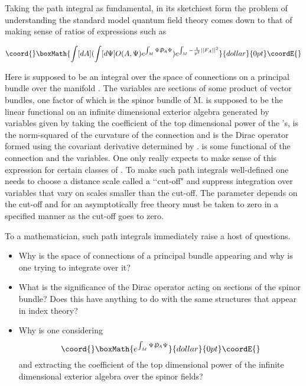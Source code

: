 \documentclass[a4paper,a4paper]{article}
\theoremstyle{conjecture}
\def\Slash#1{#1\!\!\!\!/}
\def\Dirac{\Slash D}
\begin{document}
Taking the path integral as fundamental, in its sketchiest form the problem of understanding
the standard model quantum field theory comes down to that of making sense
of ratios of expressions such as

$$\coord{}\boxMath{\int [dA]  (\int [d\Psi] O(A,\Psi) e^{\int_M
\Psi\Dirac_A\Psi})e^{\int_M -\frac{1}{g^2} ||F_A||^2}}{dollar}{0pt}\coordE{}$$

Here \myHighlight{$\int [dA]$}\coordHE{} is supposed to be an integral over the space of connections on
a principal bundle over the manifold \coordHE{}. The variables  \myHighlight{$\Psi$}\coordHE{} are
sections of some product of vector bundles, one factor of which is the spinor bundle of M. \myHighlight{$\int [d\Psi]$}\coordHE{} is supposed to
be the linear functional on an infinite dimensional exterior algebra generated by variables \myHighlight{$\Psi$}\coordHE{} given
by taking the coefficient of the top dimensional power of the \myHighlight{$\Psi$}\coordHE{}'s, \coordHE{}
is the norm-squared of the curvature of the connection \coordHE{} and \myHighlight{$\Dirac_A$}\coordHE{} is the
Dirac operator formed using the covariant derivative determined by \coordHE{}. 
\coordHE{}
is some functional of the connection and the \myHighlight{$\Psi$}\coordHE{} variables. One only really expects
to make sense of this expression for certain classes of \coordHE{}.  To make such path
integrals well-defined one needs to choose a distance scale called a \lq\lq cut-off"
and suppress integration over
variables that vary on scales smaller than the cut-off.  The parameter \coordHE{} depends on the
cut-off and for an asymptotically free theory must be taken to zero in a specified manner
as the cut-off goes to zero.

To a mathematician, such path integrals immediately raise a host of questions.
\begin{itemize}
\item
Why is the space of connections
of a principal bundle appearing and why is one trying to integrate over it?
\item
What is the
significance of the Dirac operator acting on sections of the spinor bundle? Does this
have anything to do with the same structures that appear in index theory?
\item
Why is one considering
$$\coord{}\boxMath{e^{\int_M\Psi\Dirac_A\Psi}}{dollar}{0pt}\coordE{}$$
and extracting
the coefficient of the top dimensional power of the infinite dimensional exterior algebra over the spinor fields?
\end{itemize}
\end{document}
